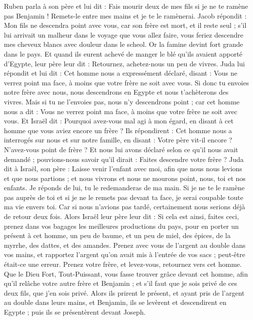 \begin{multicols}{2}
Ruben parla à son père et lui dit : Fais mourir deux de mes fils si je ne te ramène pas Benjamin ! Remets-le entre mes mains et je te le ramènerai.
Jacob répondit : Mon fils ne descendra point avec vous, car son frère est mort, et il reste seul ; s’il lui arrivait un malheur dans le voyage que vous allez faire, vous feriez descendre mes cheveux blancs avec douleur dans le scheol.
\VerseOne{}Or la famine devint fort grande dans le pays.
Et quand  ils eurent achevé de manger le blé qu'ils avaient apporté d'Egypte, leur père leur dit : Retournez, achetez-nous un peu de vivres.
Juda lui répondit et lui dit : Cet homme nous a expressément déclaré, disant : Vous ne verrez point ma face, à moins que votre frère ne soit avec vous.
Si donc tu envoies notre frère avec nous, nous descendrons en Egypte et nous t'achèterons des vivres.
Mais si tu ne l'envoies pas, nous n'y descendrons point ; car cet homme nous a dit : Vous ne verrez point ma face, à moins que votre frère ne soit avec vous.
Et Israël dit : Pourquoi avez-vous mal agi à mon égard, en disant à cet homme que vous aviez encore un frère ?
Ils répondirent : Cet homme nous a interrogés sur nous et sur notre famille, en disant : Votre père vit-il encore ? N'avez-vous point de frère ? Et nous lui avons déclaré selon ce qu'il nous avait demandé ; pouvions-nous savoir qu'il dirait : Faites descendre votre frère ?
Juda dit à Israël, son père : Laisse venir l'enfant avec moi, afin que nous nous levions et que nous partions ; et nous vivrons et nous ne mourons point, nous, toi et nos enfants.
Je réponds de lui, tu le redemanderas de ma main. Si je ne te le ramène pas auprès de toi et si je ne le remets pas devant ta face, je serai coupable toute ma vie envers toi.
Car si nous n’avions pas tardé, certainement nous serions déjà de retour deux fois.
Alors Israël leur père leur dit : Si cela est ainsi, faites ceci, prenez dans vos bagages les meilleures productions du pays, pour en  porter un présent à cet homme, un peu de baume, et un peu de miel, des épices, de la myrrhe, des dattes, et des amandes.
Prenez avec vous de l'argent au double dans vos mains, et rapportez l’argent qu’on avait mis à l’entrée de vos sacs ; peut-être était-ce une erreur.
Prenez votre frère, et levez-vous, retournez vers cet homme.
Que le Dieu Fort, Tout-Puissant, vous fasse trouver grâce devant cet homme, afin qu'il relâche votre autre frère et Benjamin ; et s'il faut que je sois privé de ces deux fils, que j'en sois privé.
Alors ils prirent le présent, et ayant pris de l'argent au double dans leurs mains, et Benjamin, ils se levèrent et descendirent en Egypte ; puis ils se présentèrent devant Joseph.

\end{multicols}
